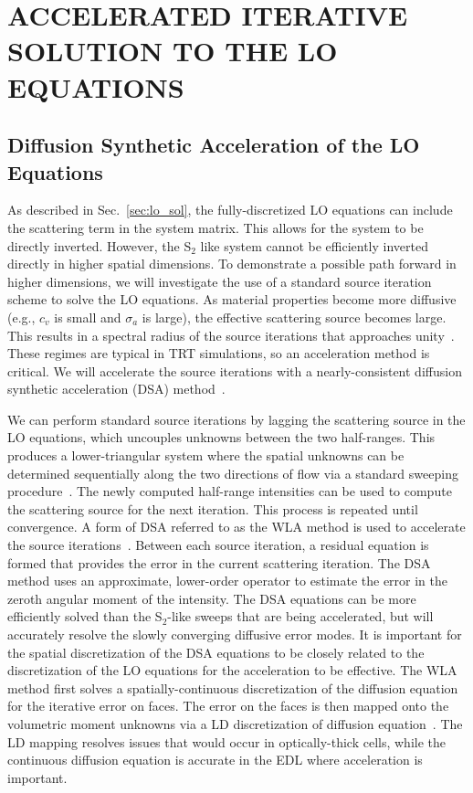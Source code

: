 
\chapter{\uppercase {Accelerated Iterative Solution to the LO Equations}}

\section{Diffusion Synthetic Acceleration of the LO Equations}

As described in Sec.~\ref{sec:lo_sol}, the fully-discretized LO equations can include
the scattering term in the system matrix.  This allows for the system to be directly
inverted.
However, the S$_2$ like system cannot be efficiently inverted
directly in higher spatial dimensions.  To demonstrate a possible path forward in
higher dimensions, we will investigate the use of a standard
source iteration scheme to solve the LO equations.  As
material properties become more diffusive (e.g., $c_v$ is small and $\sigma_a$ is
large), the effective scattering source becomes large.  This results in a spectral radius of the source iterations that approaches
unity~\cite{morel_newton}.  These regimes are typical in TRT simulations, so an
acceleration method is critical.  We will accelerate the source iterations with a nearly-consistent diffusion synthetic acceleration
(DSA) method~\cite{wla,wla_thesis}.

We can perform standard source iterations by lagging the scattering source in the LO
equations, which
uncouples unknowns between the two half-ranges.  This produces a lower-triangular
system where the spatial unknowns can be determined sequentially along the two directions of flow via a
standard sweeping procedure~\cite{lewis,morel_newton}.  The newly computed half-range
intensities can be used to compute the scattering source for the next iteration.  This
process is repeated until convergence.  
A form of DSA referred to as the WLA method is used to accelerate the source iterations~\cite{wla}. 
Between each source iteration, a residual equation is formed that provides 
the error in the current scattering iteration. The DSA method uses an approximate,
lower-order operator to estimate the error in the zeroth angular moment of the
intensity.  The DSA equations can be more efficiently
solved than the S$_2$-like sweeps that are being accelerated, but will accurately resolve the
slowly converging diffusive error modes.  It is important for the spatial discretization of the DSA
equations to be closely related to the discretization of the LO equations for the
acceleration to be effective.  The WLA method first solves a spatially-continuous
discretization of the diffusion equation
for the iterative error on faces.  The error on the faces is then mapped onto the
volumetric moment unknowns via a LD discretization of diffusion equation~\cite{wla}.
The LD mapping resolves issues that would occur in optically-thick cells, while the
continuous diffusion equation is accurate in the EDL where acceleration is important.


